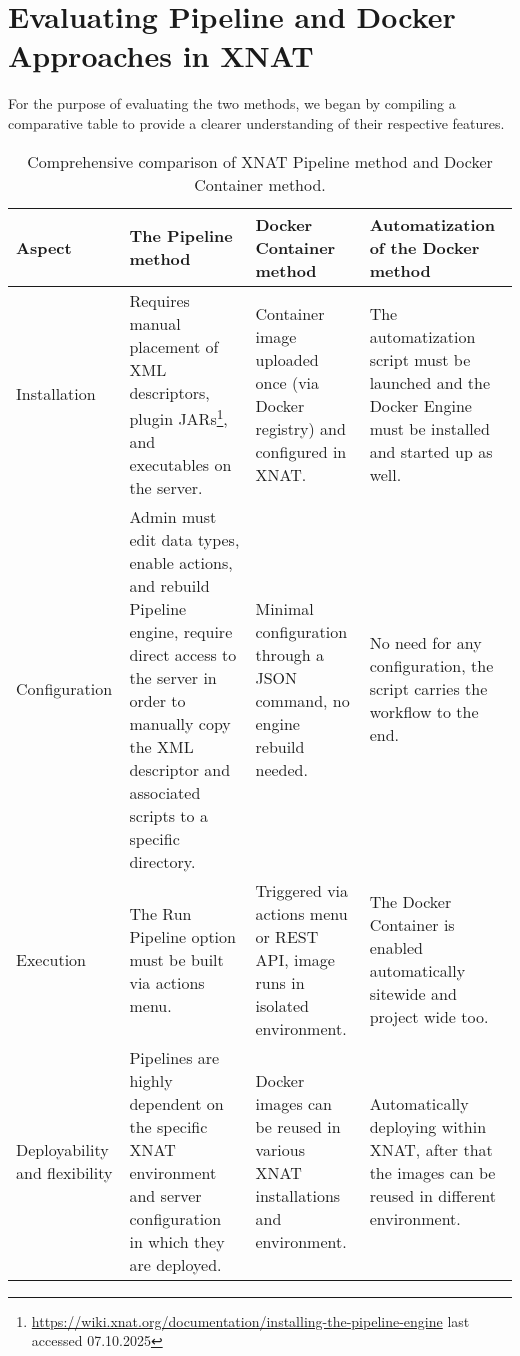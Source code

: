 \section{Evaluating Pipeline and Docker Approaches in XNAT}

For the purpose of evaluating the two methods, we began by compiling a comparative table to provide a clearer understanding of their respective features.

\begin{table}[H]
  \centering
  \caption{Comprehensive comparison of XNAT Pipeline method and Docker Container method.}
  \label{tab:pipeline-vs-docker}

  \begin{tabular}{|>{\centering\arraybackslash}p{2cm}|
                      >{\centering\arraybackslash}p{4cm}|
                      >{\centering\arraybackslash}p{4cm}|
                      >{\centering\arraybackslash}p{4cm}|}
    \hline
    \textbf{Aspect} & \textbf{The Pipeline method} & \textbf{Docker Container method} & \textbf{Automatization of the Docker method}\\ \hline
    
    
    Installation & Requires manual placement of XML descriptors, plugin JARs\footnote{\url{https://wiki.xnat.org/documentation/installing-the-pipeline-engine} last accessed 07.10.2025}, and executables on the server. & Container image uploaded once (via Docker registry) and configured in XNAT. & The automatization script must be launched and the Docker Engine must be installed and started up as well. \\ \hline
    

    
    Configuration & Admin must edit data types, enable actions, and rebuild Pipeline engine, require direct access to the server in order to manually copy the XML descriptor and associated scripts to a specific directory. & Minimal configuration through a JSON command, no engine rebuild needed. & No need for any configuration, the script carries the workflow to the end. \\ \hline
    
    Execution & The Run Pipeline option must be built via actions menu. & Triggered via actions menu or REST API, image runs in isolated environment. & The Docker Container is enabled automatically sitewide and project wide too. \\ \hline

    Deployability and flexibility & Pipelines are highly dependent on the specific XNAT environment and server configuration in which they are deployed. & Docker images can be reused in various XNAT installations and environment. & Automatically deploying within XNAT, after that the images can be reused in different environment. \\ \hline
    

\end{tabular}
\end{table}
